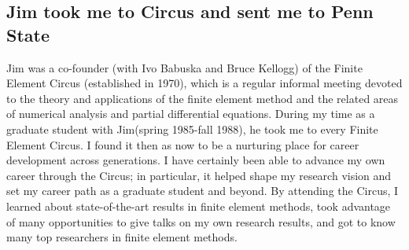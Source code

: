\documentclass[CJK,11pt]{amsart}
\theoremstyle{definition}
\begin{document}
\begin{CJK*}{UTF8}{gbsn}
\section{Jim took me to Circus and sent me to Penn State}
Jim was a co-founder (with Ivo Babuska and Bruce Kellogg) of the Finite Element Circus (established in 1970), which is a regular informal meeting devoted to the theory and applications of the finite element method and the related areas of numerical analysis and partial differential equations. During my time as a graduate student with Jim(spring 1985-fall 1988), he took me to every Finite Element Circus. I found it then as now to be a nurturing place for career development across generations. I have certainly been able to advance my own career through the Circus; in particular, it helped shape my research vision and set my career path as a graduate student and beyond. By attending the Circus, I learned about state-of-the-art results in finite element methods, took advantage of many opportunities to give talks on my own research results, and got to know many top researchers in finite element methods.


\end{CJK*}
\end{document}
